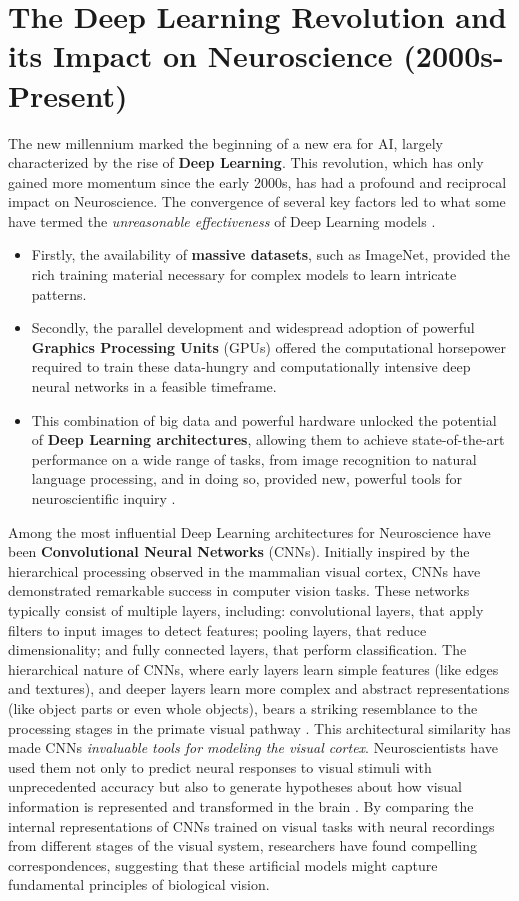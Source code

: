 \section{The Deep Learning Revolution and its Impact on Neuroscience (2000s-Present)}\label{sec:2000s}

The new millennium marked the beginning of a new era for AI, largely characterized by the rise of \textbf{Deep Learning}. This revolution, which has only gained more momentum since the early 2000s, has had a profound and reciprocal impact on Neuroscience. The convergence of several key factors led to what some have termed the \textit{unreasonable effectiveness} of Deep Learning models \cite{lecun2015deep}.
\begin{itemize}
    \item Firstly, the availability of \textbf{massive datasets}, such as ImageNet, provided the rich training material necessary for complex models to learn intricate patterns.
    \item Secondly, the parallel development and widespread adoption of powerful \textbf{Graphics Processing Units} (GPUs) offered the computational horsepower required to train these data-hungry and computationally intensive deep neural networks in a feasible timeframe.
    \item This combination of big data and powerful hardware unlocked the potential of \textbf{Deep Learning architectures}, allowing them to achieve state-of-the-art performance on a wide range of tasks, from image recognition to natural language processing, and in doing so, provided new, powerful tools for neuroscientific inquiry \cite{richards2019deep}.
\end{itemize}

Among the most influential Deep Learning architectures for Neuroscience have been \textbf{Convolutional Neural Networks} (CNNs). Initially inspired by the hierarchical processing observed in the mammalian visual cortex, CNNs have demonstrated remarkable success in computer vision tasks. These networks typically consist of multiple layers, including: convolutional layers, that apply filters to input images to detect features; pooling layers, that reduce dimensionality; and fully connected layers, that perform classification. The hierarchical nature of CNNs, where early layers learn simple features (like edges and textures), and deeper layers learn more complex and abstract representations (like object parts or even whole objects), bears a striking resemblance to the processing stages in the primate visual pathway \cite{yamins2016using}. This architectural similarity has made CNNs \textit{invaluable tools for modeling the visual cortex}. Neuroscientists have used them not only to predict neural responses to visual stimuli with unprecedented accuracy but also to generate hypotheses about how visual information is represented and transformed in the brain \cite{kriegeskorte2018cognitive, savage2019how}. By comparing the internal representations of CNNs trained on visual tasks with neural recordings from different stages of the visual system, researchers have found compelling correspondences, suggesting that these artificial models might capture fundamental principles of biological vision.

